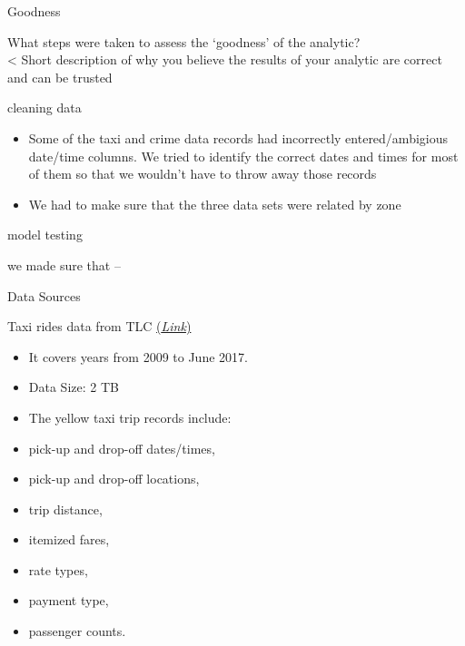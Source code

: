 \documentclass[10pt,ignorenonframetext,]{beamer}
\providecommand{\tightlist}{%
  \setlength{\itemsep}{0pt}\setlength{\parskip}{0pt}}
\begin{document}
\begin{frame}{Goodness}

What steps were taken to assess the `goodness' of the analytic?\\
\textless{} Short description of why you believe the results of your
analytic are correct and can be trusted

\begin{block}{cleaning data}

\begin{itemize}
\tightlist
\item
  Some of the taxi and crime data records had incorrectly
  entered/ambigious date/time columns. We tried to identify the correct
  dates and times for most of them so that we wouldn't have to throw
  away those records
\item
  We had to make sure that the three data sets were related by zone
\end{itemize}

\end{block}

\begin{block}{model testing}

we made sure that --

\end{block}

\end{frame}

\begin{frame}{Data Sources}

\begin{block}{Taxi rides data from TLC
\href{http://www.nyc.gov/html/tlc/html/about/trip_record_data.shtml}{(\emph{Link})}}

\begin{itemize}
\item
  It covers years from 2009 to June 2017.
\item
  Data Size: 2 TB
\item
  The yellow taxi trip records include:
\item
  pick-up and drop-off dates/times,
\item
  pick-up and drop-off locations,
\item
  trip distance,
\item
  itemized fares,
\item
  rate types,
\item
  payment type,
\item
  passenger counts.
\end{itemize}

\end{block}

\end{frame}
\end{document}
